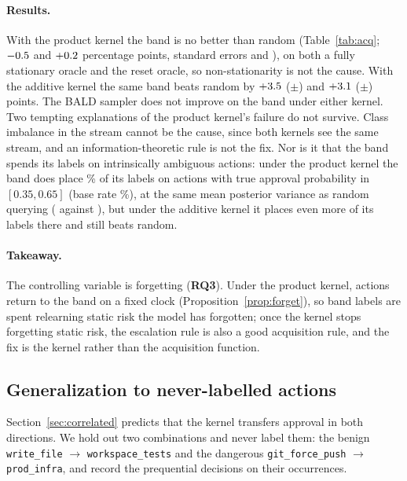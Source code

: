 \documentclass[11pt]{article}
\newcommand{\RQ}[1]{\textbf{RQ#1}}
\begin{document}
\paragraph{Results.} With the product kernel the band is no better than random
(Table~\ref{tab:acq}; $-0.5$ and $+0.2$ percentage points,
standard errors \resAcqVSSe{} and \resAcqVCSe), on both a fully stationary
oracle and the reset oracle, so non-stationarity is not the cause. With the
additive kernel the same band beats random by $+3.5$
($\pm$\resAcqASSe) and $+3.1$ ($\pm$\resAcqACSe) points. The BALD
sampler does not improve on the band under either kernel. Two tempting
explanations of the product kernel's failure do not survive. Class imbalance
in the stream cannot be the cause, since both kernels see the same stream, and
an information-theoretic rule is not the fix. Nor is it that the band spends its
labels on intrinsically ambiguous actions: under the product kernel the band
does place \resPlaceBandAmb\% of its labels on actions with true approval
probability in $[0.35, 0.65]$ (base rate \resPlaceBaseAmb\%), at the same mean
posterior variance as random querying (\resPlaceBandVar{} against
\resPlaceRandomVar), but under the additive kernel it places even more of its
labels there and still beats random.

\paragraph{Takeaway.} The controlling variable is forgetting (\RQ3). Under the
product kernel, actions return to the band on a fixed clock
(Proposition~\ref{prop:forget}), so band labels are spent relearning static
risk the model has forgotten; once the kernel stops forgetting static risk,
the escalation rule is also a good acquisition rule, and the fix is the kernel
rather than the acquisition function.

\subsection{Generalization to never-labelled actions}\label{sec:exp-transfer}

Section~\ref{sec:correlated} predicts that the kernel transfers approval in
both directions. We hold out two combinations and never label them: the
benign \texttt{write\_file} $\to$ \texttt{workspace\_tests} and the dangerous
\texttt{git\_force\_push} $\to$ \texttt{prod\_infra}, and record the
prequential decisions on their occurrences.
\end{document}
